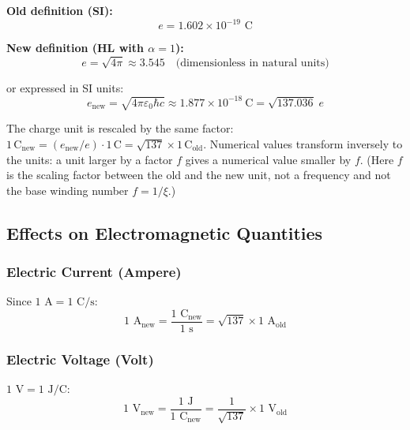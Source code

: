 	\textbf{Old definition (SI):}
	\begin{equation}
		e = 1.602 \times 10^{-19} \text{ C}
	\end{equation}
	
	\textbf{New definition (HL with $\alpha = 1$):}
	\begin{equation}
		e = \sqrt{4\pi} \approx 3.545 \quad \text{(dimensionless in natural units)}
	\end{equation}
	
	or expressed in SI units:
	\begin{equation}
		e_{\text{new}} = \sqrt{4\pi\varepsilon_0\hbar c} \approx 1.877 \times 10^{-18}\ \text{C} = \sqrt{137.036}\; e
	\end{equation}
	
	The charge unit is rescaled by the same factor: $1\,\text{C}_{\text{new}} = (e_{\text{new}}/e)\cdot 1\,\text{C} = \sqrt{137}\times 1\,\text{C}_{\text{old}}$. Numerical values transform inversely to the units: a unit larger by a factor $f$ gives a numerical value smaller by $f$. (Here $f$ is the scaling factor between the old and the new unit, not a frequency and not the base winding number $f = 1/\xi$.)

	\subsection{Effects on Electromagnetic Quantities}
	
	\subsubsection{Electric Current (Ampere)}
	
	Since $1 \text{ A} = 1 \text{ C/s}$:
	\begin{equation}
		1 \text{ A}_{\text{new}} = \frac{1 \text{ C}_{\text{new}}}{1 \text{ s}} = \sqrt{137} \times 1 \text{ A}_{\text{old}}
	\end{equation}
	
	\subsubsection{Electric Voltage (Volt)}
	
	$1 \text{ V} = 1 \text{ J/C}$:
	\begin{equation}
		1 \text{ V}_{\text{new}} = \frac{1 \text{ J}}{1 \text{ C}_{\text{new}}} = \frac{1}{\sqrt{137}} \times 1 \text{ V}_{\text{old}}
	\end{equation}
	
